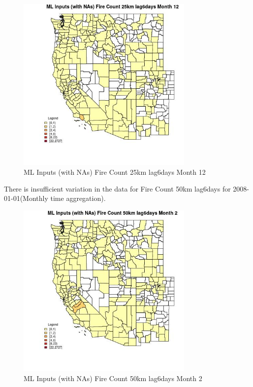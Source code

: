 \begin{figure} 
\centering  
\includegraphics[width=0.77\textwidth]{Code_Outputs/Report_ML_input_PM25_Step4_part_f_de_duplicated_aves_prioritize_24hr_obswNAs_CountyFire_Count_25km_lag6daysmedianMonth12.jpg} 
\caption{\label{fig:Report_ML_input_PM25_Step4_part_f_de_duplicated_aves_prioritize_24hr_obswNAsCountyFire_Count_25km_lag6daysmedianMonth12}ML Inputs (with NAs) Fire Count 25km lag6days Month 12} 
\end{figure} 
 

There is insufficient variation in the data for Fire Count 50km lag6days for 2008-01-01(Monthly time aggregation). 
 

\begin{figure} 
\centering  
\includegraphics[width=0.77\textwidth]{Code_Outputs/Report_ML_input_PM25_Step4_part_f_de_duplicated_aves_prioritize_24hr_obswNAs_CountyFire_Count_50km_lag6daysmedianMonth2.jpg} 
\caption{\label{fig:Report_ML_input_PM25_Step4_part_f_de_duplicated_aves_prioritize_24hr_obswNAsCountyFire_Count_50km_lag6daysmedianMonth2}ML Inputs (with NAs) Fire Count 50km lag6days Month 2} 
\end{figure} 
 

